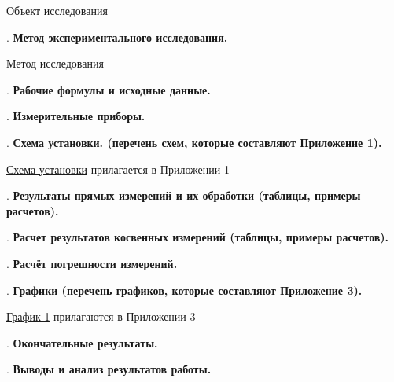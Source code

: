 \documentclass[12pt]{article}
\newcommand{\placeholder}[1]{{\color{magenta}#1}}
\begin{document}
    \placeholder{Объект исследования}

    \mediumvspace

    . \textbf{Метод экспериментального исследования.}

    \placeholder{Метод исследования}

    \mediumvspace

    . \textbf{Рабочие формулы и исходные данные.}

    

    \mediumvspace

    \clearpage

    . \textbf{Измерительные приборы.}

    \smallvspace

    

    \mediumvspace

    . \textbf{Схема установки. (перечень схем, которые составляют Приложение 1).}

    \hyperlink{schema1}{Схема установки} прилагается в Приложении 1

    \mediumvspace

    . \textbf{Результаты прямых измерений и их обработки (таблицы, примеры расчетов).}

    

    \mediumvspace

    . \textbf{Расчет результатов косвенных измерений (таблицы, примеры расчетов).}

    

    \mediumvspace

    . \textbf{Расчёт погрешности измерений.}

    

    \mediumvspace

    . \textbf{Графики (перечень графиков, которые составляют Приложение 3).}

    \hyperlink{diagram1}{График 1} прилагаются в Приложении 3

    \mediumvspace

    . \textbf{Окончательные результаты.}

    

    \mediumvspace

    . \textbf{Выводы и анализ результатов работы.}
\end{document}
